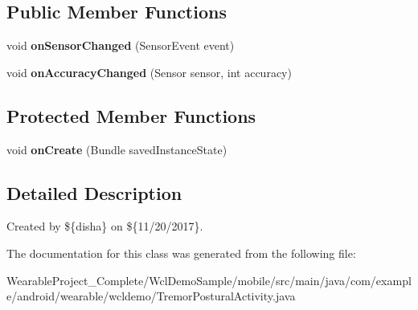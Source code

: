 \subsection*{Public Member Functions}
\begin{DoxyCompactItemize}
\item 
void {\bfseries on\+Sensor\+Changed} (Sensor\+Event event)\hypertarget{classcom_1_1example_1_1android_1_1wearable_1_1wcldemo_1_1TremorPosturalActivity_a8d0f038b8ca62502d6de6952c7944594}{}\label{classcom_1_1example_1_1android_1_1wearable_1_1wcldemo_1_1TremorPosturalActivity_a8d0f038b8ca62502d6de6952c7944594}

\item 
void {\bfseries on\+Accuracy\+Changed} (Sensor sensor, int accuracy)\hypertarget{classcom_1_1example_1_1android_1_1wearable_1_1wcldemo_1_1TremorPosturalActivity_a706a144a0511f11fc56a2e4e94943f29}{}\label{classcom_1_1example_1_1android_1_1wearable_1_1wcldemo_1_1TremorPosturalActivity_a706a144a0511f11fc56a2e4e94943f29}

\end{DoxyCompactItemize}
\subsection*{Protected Member Functions}
\begin{DoxyCompactItemize}
\item 
void {\bfseries on\+Create} (Bundle saved\+Instance\+State)\hypertarget{classcom_1_1example_1_1android_1_1wearable_1_1wcldemo_1_1TremorPosturalActivity_a7ec0ddbfc13e41e34810431f822a5dda}{}\label{classcom_1_1example_1_1android_1_1wearable_1_1wcldemo_1_1TremorPosturalActivity_a7ec0ddbfc13e41e34810431f822a5dda}

\end{DoxyCompactItemize}


\subsection{Detailed Description}
Created by \$\{disha\} on \$\{11/20/2017\}. 

The documentation for this class was generated from the following file\+:\begin{DoxyCompactItemize}
\item 
Wearable\+Project\+\_\+\+Complete/\+Wcl\+Demo\+Sample/mobile/src/main/java/com/example/android/wearable/wcldemo/Tremor\+Postural\+Activity.\+java\end{DoxyCompactItemize}
